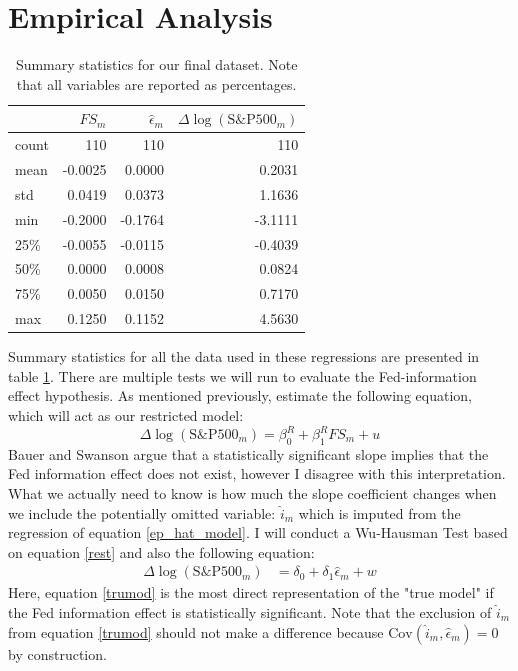 \documentclass[a4paper,man,floatsintext,natbib]{apa6}
\begin{document}
	\section{Empirical Analysis}
	\begin{table}
		\centering
		\begin{tabular}{lrrr}
			\toprule
			{} &  \(FS_m\) &  \(\hat{\epsilon}_m\) & \(\Delta \log{(\text{S\&P500}_m)}\) \\
			\midrule
			count & 110 &          110&       110 \\
			mean  &  -0.0025 &            0.0000 &         0.2031 \\
			std   &   0.0419 &            0.0373 &         1.1636 \\
			min   &  -0.2000 &           -0.1764 &        -3.1111 \\
			25\%   &  -0.0055 &           -0.0115 &        -0.4039 \\
			50\%   &   0.0000 &            0.0008 &         0.0824 \\
			75\%   &   0.0050 &            0.0150 &         0.7170 \\
			max   &   0.1250 &            0.1152 &         4.5630 \\
			\bottomrule
		\end{tabular}
		\caption{Summary statistics for our final dataset. Note that all variables are reported as percentages.}
		\label{SumStats}
	\end{table}
	Summary statistics for all the data used in these regressions are presented in table \ref{SumStats}. There are multiple tests we will run to evaluate the Fed-information effect hypothesis. As mentioned previously, \cite{Bauer2020} estimate the following equation, which will act as our restricted model:
	\[
	\Delta \log{(\text{S\&P500}_m)} = \beta^R_0 + \beta^R_1 FS_m + u \tag{6} \label{rest}
	\]
	Bauer and Swanson argue that a statistically significant slope implies that the Fed information effect does not exist, however I disagree with this interpretation. What we actually need to know is how much the slope coefficient changes when we include the potentially omitted variable: \(\hat{i}_m\) which is imputed from the regression of equation \ref{ep_hat_model}. I will conduct a Wu-Hausman Test based on equation \ref{rest} and also the following equation:
	\begin{align*}
		\Delta \log{(\text{S\&P500}_m)} &= \delta_0 + \delta_1 \hat{\epsilon}_m + w \tag{8} \label{trumod}
	\end{align*}
	Here, equation \ref{trumod} is the most direct representation of the "true model" if the Fed information effect is statistically significant. Note that the exclusion of \(\hat{i}_m\) from equation \ref{trumod} should not make a difference because \(\mathrm{Cov}(\hat{i}_m, \hat{\epsilon}_m) = 0\) by construction.
\end{document}
